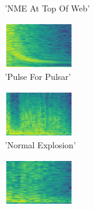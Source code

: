 \begin{figure}[H]
{\begin{subfigure}{0.23\textwidth}
{{        }\hspace*{0.75cm}%
      }%
      \caption*{'NME At Top Of Web'}
    \end{subfigure}
    \begin{subfigure}{0.23\textwidth}
      \includegraphics[width=3cm]{sounds/buttons/16.wav-button.png}%
      \caption*{'Pulse For Pulsar'}
    \end{subfigure}
    \begin{subfigure}{0.23\textwidth}
      \includegraphics[width=3cm]{sounds/buttons/17.wav-button.png}%
      \caption*{'Normal Explosion'}
    \end{subfigure}
    \begin{subfigure}{0.23\textwidth}
      \includegraphics[width=3cm]{sounds/buttons/18.wav-button.png}%
\end{subfigure}}
\end{figure}
